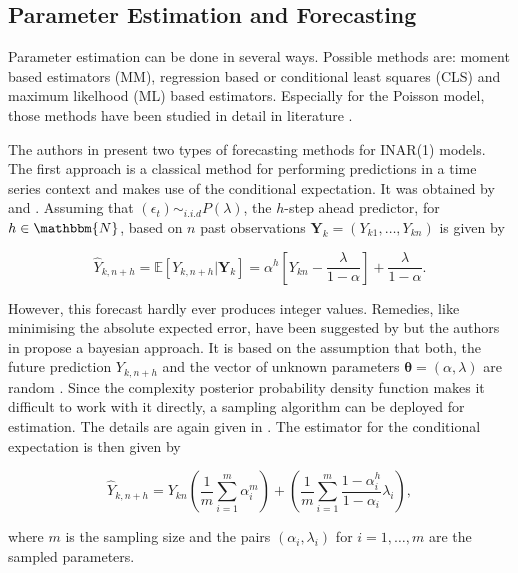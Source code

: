 \subsection{Parameter Estimation and Forecasting}
\label{sec: Inar Parameter Estimation and Forecasting}

Parameter estimation can be done in several ways. Possible methods are: moment based estimators (MM), regression based or conditional least squares (CLS) and maximum likelhood (ML) based estimators. Especially for the Poisson model, those methods have been studied in detail in literature \cite{Silva:2005}. 

The authors in \cite{Silva:2005} present two types of forecasting methods for INAR(1) models. The first approach is a classical method for performing predictions in a time series context and makes use of the conditional expectation. It was obtained by \cite{Bre:1993} and \cite{Freeland:2004}. Assuming that $(\epsilon_t) \sim_{i.i.d} P(\lambda)$, the $h$-step ahead predictor, for $h\in \mathbbm{N}$, based on $n$ past observations $\bm{Y}_k=(Y_{k1},\ldots,Y_{kn})$ is given by

\begin{equation}
\hat{Y}_{k,n+h} = \mathbb{E}[Y_{k,n+h} | \bm{Y}_k] = \alpha^h \left[Y_{kn}- \frac{\lambda}{1-\alpha} \right] + \frac{\lambda}{1-\alpha}.
\label{eq:Forecasting Classic}
\end{equation}


However, this forecast hardly ever produces integer values. Remedies, like minimising the absolute expected error, have been suggested by \cite{Freeland:2004} but the authors in \cite{Silva:2005} propose a bayesian approach. It is based on the assumption that both, the future prediction $Y_{k,n+h}$ and the vector of unknown parameters $\bm{\theta}=(\alpha,\lambda)$ are random \cite{Silva:2005}. Since the complexity posterior probability density function makes it difficult to work with it directly, a sampling algorithm can be deployed for estimation. The details are again given in \cite{Silva:2005}. The estimator for the conditional expectation is then given by

\begin{equation}
\hat{Y}_{k,n+h}= Y_{kn}\left(\frac{1}{m} \sum_{i=1}^m\alpha_i^m\right) + \left(\frac{1}{m} \sum_{i=1}^m \frac{1-\alpha_i^h}{1-\alpha_i}\lambda_i\right),
\label{eq:Forecasting Bayesian}
\end{equation}

where $m$ is the sampling size and the pairs $(\alpha_i,\lambda_i)$ for $i=1,\ldots,m$ are the sampled parameters. 


